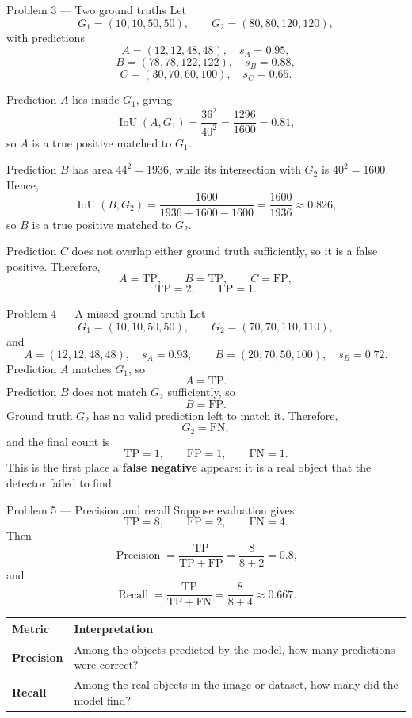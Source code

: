 \documentclass[11pt]{article}
\begin{document}
\begin{practicebox}{Problem 3 --- Two ground truths}
Let
\[
G_1=(10,10,50,50),
\qquad
G_2=(80,80,120,120),
\]
with predictions
\[
A=(12,12,48,48),\quad s_A=0.95,
\]
\[
B=(78,78,122,122),\quad s_B=0.88,
\]
\[
C=(30,70,60,100),\quad s_C=0.65.
\]

Prediction \(A\) lies inside \(G_1\), giving
\[
\operatorname{IoU}(A,G_1)=\frac{36^2}{40^2}
=\frac{1296}{1600}=0.81,
\]
so \(A\) is a true positive matched to \(G_1\).

Prediction \(B\) has area \(44^2=1936\), while its intersection with \(G_2\) is \(40^2=1600\). Hence,
\[
\operatorname{IoU}(B,G_2)
=\frac{1600}{1936+1600-1600}
=\frac{1600}{1936}
\approx0.826,
\]
so \(B\) is a true positive matched to \(G_2\).

Prediction \(C\) does not overlap either ground truth sufficiently, so it is a false positive. Therefore,
\[
\boxed{A=\mathrm{TP},\qquad B=\mathrm{TP},\qquad C=\mathrm{FP}},
\]
\[
\boxed{\mathrm{TP}=2,\qquad \mathrm{FP}=1}.
\]
\end{practicebox}

\begin{practicebox}{Problem 4 --- A missed ground truth}
Let
\[
G_1=(10,10,50,50),
\qquad
G_2=(70,70,110,110),
\]
and
\[
A=(12,12,48,48),\quad s_A=0.93,
\qquad
B=(20,70,50,100),\quad s_B=0.72.
\]
Prediction \(A\) matches \(G_1\), so
\[
\boxed{A=\mathrm{TP}}.
\]
Prediction \(B\) does not match \(G_2\) sufficiently, so
\[
\boxed{B=\mathrm{FP}}.
\]
Ground truth \(G_2\) has no valid prediction left to match it. Therefore,
\[
\boxed{G_2=\mathrm{FN}},
\]
and the final count is
\[
\boxed{\mathrm{TP}=1,\qquad \mathrm{FP}=1,\qquad \mathrm{FN}=1}.
\]
This is the first place a \textbf{false negative} appears: it is a real object that the detector failed to find.
\end{practicebox}

\begin{practicebox}{Problem 5 --- Precision and recall}
Suppose evaluation gives
\[
\mathrm{TP}=8,
\qquad
\mathrm{FP}=2,
\qquad
\mathrm{FN}=4.
\]
Then
\[
\operatorname{Precision}
=\frac{\mathrm{TP}}{\mathrm{TP}+\mathrm{FP}}
=\frac{8}{8+2}
=\boxed{0.8},
\]
and
\[
\operatorname{Recall}
=\frac{\mathrm{TP}}{\mathrm{TP}+\mathrm{FN}}
=\frac{8}{8+4}
\approx\boxed{0.667}.
\]

\begin{center}
\begin{tabularx}{\textwidth}{>{\bfseries}p{2.7cm} X}
\toprule
Metric & Interpretation \\
\midrule
Precision & Among the objects predicted by the model, how many predictions were correct? \\
Recall & Among the real objects in the image or dataset, how many did the model find? \\
\bottomrule
\end{tabularx}
\end{center}
\end{practicebox}
\end{document}
